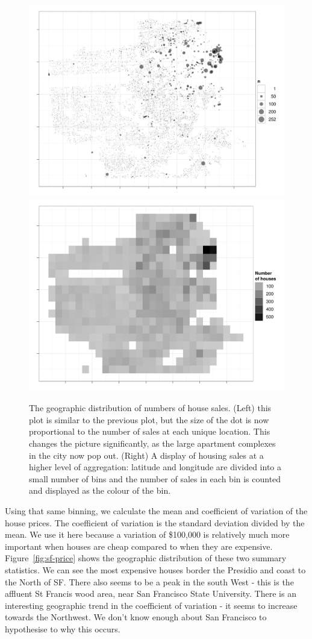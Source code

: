 \documentclass[oneside]{article}
\begin{document}
\begin{figure}[htbp]
  \centering
    \includegraphics[width=0.5\linewidth]{sf-geo-n}%
    \includegraphics[width=0.5\linewidth]{sf-bin-n}
  \caption{The geographic distribution of numbers of house sales.  (Left) this plot is similar to the previous plot, but the size of the dot is now proportional to the number of sales at each unique location.  This changes the picture significantly, as the large apartment complexes in the city now pop out.  (Right) A display of housing sales at a higher level of aggregation: latitude and longitude are divided into a small number of bins and the number of sales in each bin is counted and displayed as the colour of the bin.}
  \label{fig:sf-n}
\end{figure}

Using that same binning, we calculate the mean and coefficient of variation of the house prices.  The coefficient of variation is the standard deviation divided by the mean.  We use it here because a variation of \$100,000 is relatively much more important when houses are cheap compared to when they are expensive.  Figure~\ref{fig:sf-price} shows the geographic distribution of these two summary statistics.   We can see the most expensive houses border the Presidio and coast to the North of SF.  There also seems to be a peak in the south West - this is the affluent St Francis wood area, near San Francisco State University.  There is an interesting geographic trend in the coefficient of variation - it seems to increase towards the Northwest.  We don't know enough about San Francisco to hypothesise to why this occurs.
\end{document}
